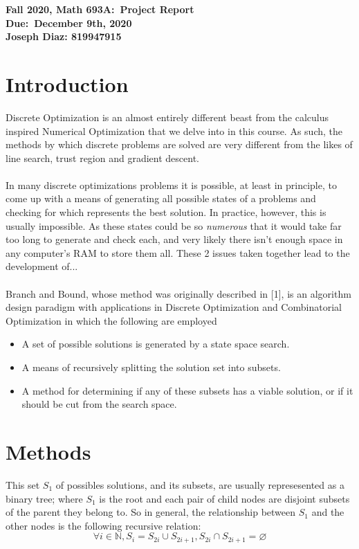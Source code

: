 \documentclass{article}
\begin{document}
	\begin{center}
		\textbf{Fall 2020, Math 693A:\ Project Report} \\
		\textbf{Due:\ December 9th, 2020} \\
		\textbf{Joseph Diaz: 819947915}
	\end{center}
\noindent\makebox[\linewidth]{\rule{\paperwidth}{0.4pt}}
\section*{Introduction}
Discrete Optimization is an almost entirely different beast from the calculus inspired
Numerical Optimization that we delve into in this course. 
As such, the methods by which discrete problems are solved are very different from the 
likes of line search, trust region and gradient descent. \\\\

\noindent
In many discrete optimizations problems it is possible, at least in 
principle,
to come up with a means of generating all possible states of a problems and checking for
which represents the best solution. In practice, however, this is usually impossible.
As these states could be so 
\textit{numerous} that it would take far too long to generate and check each, and very 
likely 
there isn't enough space in any computer's RAM to store them all.
These 2 issues taken together lead to the development of... \\\\

\noindent
Branch and Bound, whose method was originally described in [1], is an algorithm design
paradigm with applications in Discrete Optimization and
Combinatorial Optimization in which the following are employed
\begin{itemize}
    \item A set of possible solutions is generated by a state space search.
    \item A means of recursively splitting the solution set into subsets.
    \item A method for determining if any of these subsets has a viable solution, or 
    if it should be cut from the search space. 
\end{itemize}

\section*{Methods}
This set $S_1$ of possibles solutions, and its subsets, are usually represesented as a 
binary tree; where $S_1$ is the root and each pair of child nodes are disjoint subsets of 
the parent they belong to. So in general, the relationship between $S_1$ and the other nodes 
is the following recursive relation:
$$\forall i \in \mathbb{N}, S_i = S_{2i} \cup S_{2i+1},
S_{2i} \cap S_{2i+1} = \varnothing$$
\end{document}
